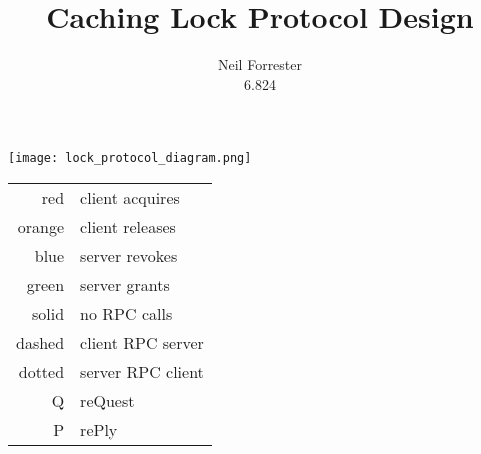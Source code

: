 \documentclass{article}
\title{Caching Lock Protocol Design}
\author{Neil Forrester\\6.824}
\begin{document}
\texttt{[image: lock\_protocol\_diagram.png]}

\begin{tabular}{r | l}
red & client acquires \\
orange & client releases \\
\hline
blue & server revokes \\
green & server grants \\
\hline
solid & no RPC calls \\
dashed & client RPC server \\
dotted & server RPC client \\
\hline
Q & reQuest \\
P & rePly \\
\end{tabular}
\end{document}
